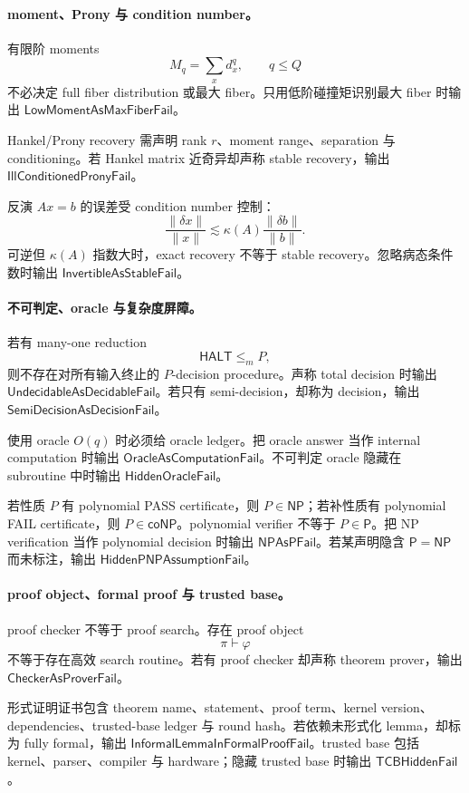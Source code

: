 \paragraph{moment、Prony 与 condition number。}
有限阶 moments
\[
M_q=\sum_x d_x^q,\qquad q\le Q
\]
不必决定 full fiber distribution 或最大 fiber。只用低阶碰撞矩识别最大 fiber 时输出 \(\mathsf{LowMomentAsMaxFiberFail}\)。

Hankel/Prony recovery 需声明 rank \(r\)、moment range、separation 与 conditioning。若 Hankel matrix 近奇异却声称 stable recovery，输出 \(\mathsf{IllConditionedPronyFail}\)。

反演 \(Ax=b\) 的误差受 condition number 控制：
\[
\frac{\|\delta x\|}{\|x\|}
\lesssim
\kappa(A)\frac{\|\delta b\|}{\|b\|}.
\]
可逆但 \(\kappa(A)\) 指数大时，exact recovery 不等于 stable recovery。忽略病态条件数时输出 \(\mathsf{InvertibleAsStableFail}\)。

\paragraph{不可判定、oracle 与复杂度屏障。}
若有 many-one reduction
\[
\boxed{
\mathsf{HALT}\le_m P,
}
\]
则不存在对所有输入终止的 \(P\)-decision procedure。声称 total decision 时输出 \(\mathsf{UndecidableAsDecidableFail}\)。若只有 semi-decision，却称为 decision，输出 \(\mathsf{SemiDecisionAsDecisionFail}\)。

使用 oracle \(O(q)\) 时必须给 oracle ledger。把 oracle answer 当作 internal computation 时输出 \(\mathsf{OracleAsComputationFail}\)。不可判定 oracle 隐藏在 subroutine 中时输出 \(\mathsf{HiddenOracleFail}\)。

若性质 \(P\) 有 polynomial PASS certificate，则 \(P\in\mathsf{NP}\)；若补性质有 polynomial FAIL certificate，则 \(P\in\mathsf{coNP}\)。polynomial verifier 不等于 \(P\in\mathsf P\)。把 NP verification 当作 polynomial decision 时输出 \(\mathsf{NPAsPFail}\)。若某声明隐含 \(\mathsf P=\mathsf{NP}\) 而未标注，输出 \(\mathsf{HiddenPNPAssumptionFail}\)。

\paragraph{proof object、formal proof 与 trusted base。}
proof checker 不等于 proof search。存在 proof object
\[
\pi\vdash\varphi
\]
不等于存在高效 search routine。若有 proof checker 却声称 theorem prover，输出 \(\mathsf{CheckerAsProverFail}\)。

形式证明证书包含 theorem name、statement、proof term、kernel version、dependencies、trusted-base ledger 与 round hash。若依赖未形式化 lemma，却标为 fully formal，输出 \(\mathsf{InformalLemmaInFormalProofFail}\)。trusted base 包括 kernel、parser、compiler 与 hardware；隐藏 trusted base 时输出 \(\mathsf{TCBHiddenFail}\)。

